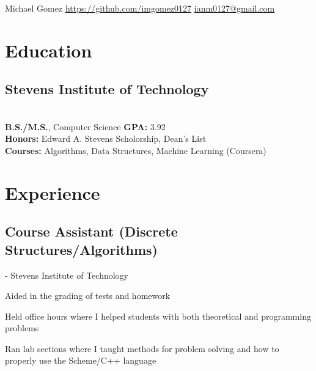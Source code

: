 \documentclass{resume}
\begin{document}
{Michael Gomez}
{\href{https://github.com/imgomez0127}{https://github.com/imgomez0127}}
{\href{mailto:ianm0127@gmail.com}{ianm0127@gmail.com}}

\section{Education}

\subsection{Stevens Institute of Technology} \\
\fontsize{10.5pt}{12pt}\selectfont
\textbf{B.S./M.S.}, Computer Science \hfill 
\textbf{GPA:} 3.92 \\
\hspace*{8.5mm}\textbf{Honors:} Edward A. Stevens Scholorship, Dean's List \\ 
\hspace*{8.5mm}\textbf{Courses:} Algorithms, Data Structures, Machine Learning (Coursera)\\ 

\section{Experience}


\subsection{Course Assistant (Discrete Structures/Algorithms)}- Stevens Institute of Technology \\
\fontsize{10.5pt}{12pt}
\begin{tightemize}
	\item Aided in the grading of tests and homework
	\item Held office hours where I helped students with both theoretical and programming problems
    \item Ran lab sections where I taught methods for problem solving and how to properly use the Scheme/C++ language
\end{tightemize}
\end{document}
